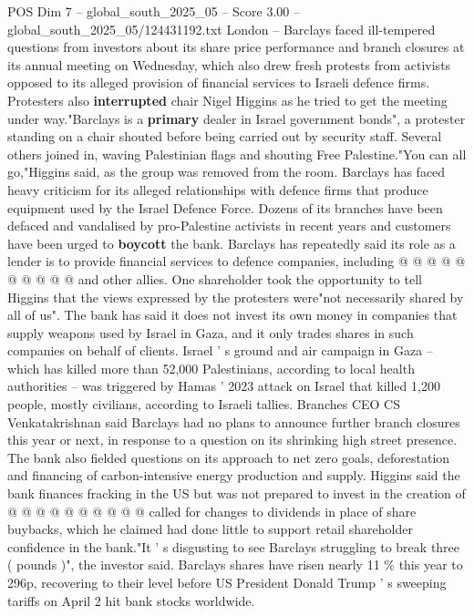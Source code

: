 \begin{textsample}{POS Dim 7 – global\_south\_2025\_05 – Score 3.00 – global\_south\_2025\_05/124431192.txt}  \label{ex:f7_pos_441}
London -- Barclays faced ill-tempered questions from investors about its share price performance and branch closures at its annual meeting on Wednesday, which also drew fresh protests from activists opposed to its alleged provision of financial services to Israeli defence firms.
Protesters also \textbf{interrupted} chair Nigel Higgins as he tried to get the meeting under way."Barclays is a \textbf{primary} dealer in Israel government bonds", a protester standing on a chair shouted before being carried out by security staff.
Several others joined in, waving Palestinian flags and shouting Free Palestine."You can all go,"Higgins said, as the group was removed from the room.
Barclays has faced heavy criticism for its alleged relationships with defence firms that produce equipment used by the Israel Defence Force.
Dozens of its branches have been defaced and vandalised by pro-Palestine activists in recent years and customers have been urged to \textbf{boycott} the bank.
Barclays has repeatedly said its role as a lender is to provide financial services to defence companies, including @ @ @ @ @ @ @ @ @ @ and other allies.
One shareholder took the opportunity to tell Higgins that the views expressed by the protesters were"not necessarily shared by all of us".
The bank has said it does not invest its own money in companies that supply weapons used by Israel in Gaza, and it only trades shares in such companies on behalf of clients.
Israel ' s ground and air campaign in Gaza -- which has killed more than 52,000 Palestinians, according to local health authorities -- was triggered by Hamas ' 2023 attack on Israel that killed 1,200 people, mostly civilians, according to Israeli tallies.
Branches CEO CS Venkatakrishnan said Barclays had no plans to announce further branch closures this year or next, in response to a question on its shrinking high street presence.
The bank also fielded questions on its approach to net zero goals, deforestation and financing of carbon-intensive energy production and supply.
Higgins said the bank finances fracking in the US but was not prepared to invest in the creation of @ @ @ @ @ @ @ @ @ @ called for changes to dividends in place of share buybacks, which he claimed had done little to support retail shareholder confidence in the bank."It ' s disgusting to see Barclays struggling to break three ( pounds )", the investor said.
Barclays shares have risen nearly 11 \% this year to 296p, recovering to their level before US President Donald Trump ' s sweeping tariffs on April 2 hit bank stocks worldwide.

\end{textsample}
